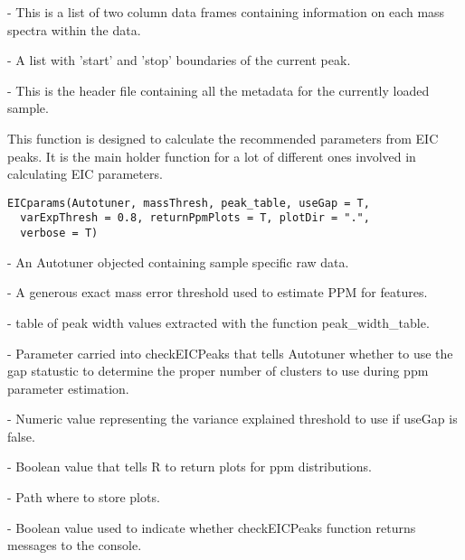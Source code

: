\documentclass[a4paper]{book}
\begin{document}
%
\begin{Arguments}
\begin{ldescription}
\item[\code{mzDb}] - This is a list of two column data frames containing information
on each mass spectra within the data.

\item[\code{observedPeak}] - A list with 'start' and 'stop' boundaries of the
current peak.

\item[\code{header}] - This is the header file containing all the metadata
for the currently loaded sample.
\end{ldescription}
\end{Arguments}
%
\begin{Description}\relax
This function is designed to calculate the recommended
parameters from EIC peaks. It is the main holder function for a lot of
different ones involved in calculating EIC parameters.
\end{Description}
%
\begin{Usage}
\begin{verbatim}
EICparams(Autotuner, massThresh, peak_table, useGap = T,
  varExpThresh = 0.8, returnPpmPlots = T, plotDir = ".",
  verbose = T)
\end{verbatim}
\end{Usage}
%
\begin{Arguments}
\begin{ldescription}
\item[\code{Autotuner}] - An Autotuner objected containing sample specific raw
data.

\item[\code{massThresh}] - A generous exact mass error threshold used to estimate
PPM for features.

\item[\code{peak\_table}] - table of peak width values extracted with the function
peak\_width\_table.

\item[\code{useGap}] - Parameter carried into checkEICPeaks that tells Autotuner
whether to use the gap statustic to determine the proper number of clusters
to use during ppm parameter estimation.

\item[\code{varExpThresh}] - Numeric value representing the variance explained
threshold to use if useGap is false.

\item[\code{returnPpmPlots}] - Boolean value that tells R to return plots for
ppm distributions.

\item[\code{plotDir}] - Path where to store plots.

\item[\code{verbose}] - Boolean value used to indicate whether checkEICPeaks function
returns messages to the console.
\end{ldescription}
\end{Arguments}
\end{document}
